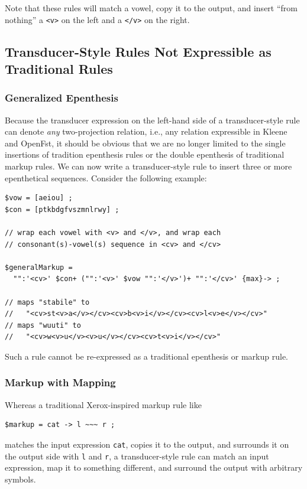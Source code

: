 \noindent
Note that these rules will match a vowel, copy it to the output, and 
insert ``from nothing'' a \verb!<v>!
on the left and a \verb!</v>! on the right.


\subsection{Transducer-Style Rules Not Expressible as Traditional Rules}

\subsubsection{Generalized Epenthesis}

Because the transducer expression on the left-hand side of a
transducer-style rule can denote \emph{any} two-projection relation,
i.e., any relation expressible in Kleene and OpenFst, it should be
obvious that we are no longer limited to the single insertions of
tradition epenthesis rules or the double epenthesis of traditional
markup rules.  We can now write a transducer-style rule to insert three
or more epenthetical sequences.  Consider the following example:

\begin{Verbatim}
$vow = [aeiou] ;
$con = [ptkbdgfvszmnlrwy] ;

// wrap each vowel with <v> and </v>, and wrap each 
// consonant(s)-vowel(s) sequence in <cv> and </cv>

$generalMarkup = 
  "":'<cv>' $con+ ("":'<v>' $vow "":'</v>')+ "":'</cv>' {max}-> ;

// maps "stabile" to 
//   "<cv>st<v>a</v></cv><cv>b<v>i</v></cv><cv>l<v>e</v></cv>"
// maps "wuuti" to 
//   "<cv>w<v>u</v><v>u</v></cv><cv>t<v>i</v></cv>"
\end{Verbatim}

\noindent
Such a rule cannot be re-expressed as a traditional epenthesis or markup rule.

\subsubsection{Markup with Mapping}

Whereas a traditional Xerox-inspired markup rule like

\begin{Verbatim}
$markup = cat -> l ~~~ r ;
\end{Verbatim}

\noindent
matches the input expression \verb!cat!, copies it to the output, and surrounds it on the output side with \verb!l! and \verb!r!, a
transducer-style rule can match an input expression, map it to something different, and
surround the output with arbitrary symbols.

